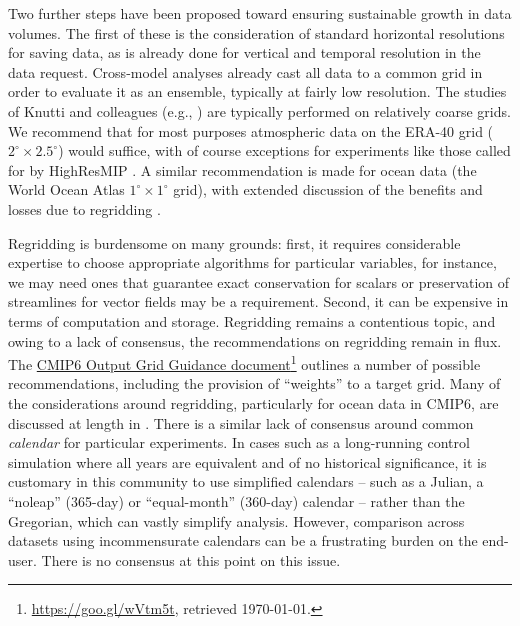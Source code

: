 \documentclass[gmd,manuscript]{copernicus}
\newcommand{\pllabel}[1]{\label{p-#1}\linelabel{l-#1}}
\newcommand{\urlref}[2] {\href{#1}{#2}\footnote{\url{#1}, retrieved \today.}}
\begin{document}
Two further steps have been proposed toward ensuring sustainable
growth in data volumes.
\pllabel{RC2-21}
The first of these is the consideration of standard horizontal
resolutions for saving data, as is already done for vertical and
temporal resolution in the data request. Cross-model analyses already
cast all data to a common grid in order to evaluate it as an ensemble,
typically at fairly low resolution. The studies of Knutti and
colleagues (e.g., \cite{ref:knuttietal2017}) are typically performed
on relatively coarse grids. We recommend that for most purposes
atmospheric data on the ERA-40 grid ($2^\circ\times 2.5^\circ$) would
suffice, with of course exceptions for experiments like those called
for by HighResMIP \citep{ref:haarsmaetal2016}. A similar
recommendation is made for ocean data (the World Ocean Atlas
$1^\circ\times 1^\circ$ grid), with extended discussion of the
benefits and losses due to regridding
\citep[see][]{ref:griffiesetal2014,ref:griffiesetal2016}.
\pllabel{RC3-14}

Regridding is burdensome on many grounds: first, it requires
considerable expertise to choose appropriate algorithms for particular
variables, for instance, we may need ones that guarantee exact
conservation for scalars or preservation of streamlines for vector
fields may be a requirement. Second, it can be expensive in terms of
computation and storage. Regridding remains a contentious topic, and
owing to a lack of consensus, the recommendations on regridding remain
in flux. The \urlref{https://goo.gl/wVtm5t}{CMIP6 Output Grid Guidance
  document} outlines a number of possible recommendations, including
the provision of ``weights'' to a target grid. Many of the
considerations around regridding, particularly for ocean data in
CMIP6, are discussed at length in \cite{ref:griffiesetal2016}. There
is a similar lack of consensus around common \emph{calendar} for
particular experiments.
\pllabel{RC3-13}
In cases such as a long-running control simulation where all years are
equivalent and of no historical significance, it is customary in this
community to use simplified calendars -- such as a Julian, a
``noleap'' (365-day) or ``equal-month'' (360-day) calendar -- rather
than the Gregorian, which can vastly simplify analysis. However,
comparison across datasets using incommensurate calendars can be a
frustrating burden on the end-user. There is no consensus at this
point on this issue.
\end{document}
